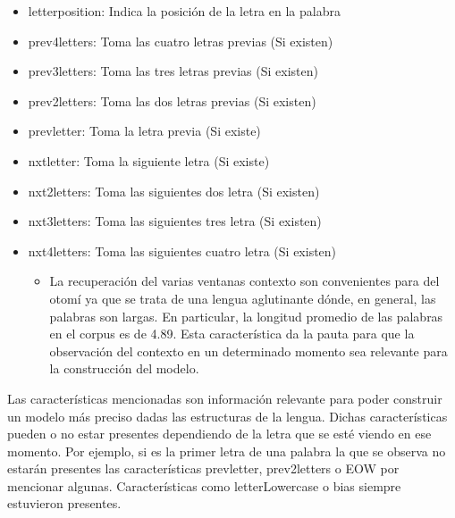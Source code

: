 \documentclass[letterpaper,12pt,oneside]{scrbook}
\theoremstyle{definition}
\begin{document}
\begin{itemize}
\begin{itemize}
		\end{itemize}

		\item \textsf{letterposition}: Indica la posición de la letra en la palabra

		\item \textsf{prev4letters}: Toma las cuatro letras previas (Si existen)

		\item \textsf{prev3letters}: Toma las tres letras previas (Si existen)

		\item \textsf{prev2letters}: Toma las dos letras previas (Si existen)

		\item \textsf{prevletter}: Toma la letra previa (Si existe)

		\item \textsf{nxtletter}: Toma la siguiente letra (Si existe)

		\item \textsf{nxt2letters}: Toma las siguientes dos letra (Si existen)

		\item \textsf{nxt3letters}: Toma las siguientes tres letra (Si existen)

		\item \textsf{nxt4letters}: Toma las siguientes cuatro letra (Si existen)

		\begin{itemize}

			\item La recuperación del varias ventanas contexto son convenientes para del otomí ya que se trata de una lengua aglutinante dónde, en general, las palabras son largas. En particular, la longitud promedio de las palabras en el corpus es de 4.89. Esta característica da la pauta para que la observación del contexto en un determinado momento sea relevante para la construcción del modelo.

		\end{itemize}

	\end{itemize}

	
	Las características mencionadas son información relevante para poder construir un modelo más preciso dadas las estructuras de la lengua. Dichas características pueden o no estar presentes dependiendo de la letra que se esté viendo en ese momento. Por ejemplo, si es la primer letra de una palabra la que se observa no estarán presentes las características \textsf{prevletter}, \textsf{prev2letters} o \textsf{EOW} por mencionar algunas. Características como \textsf{letterLowercase} o \textsf{bias} siempre estuvieron presentes.
\end{document}
